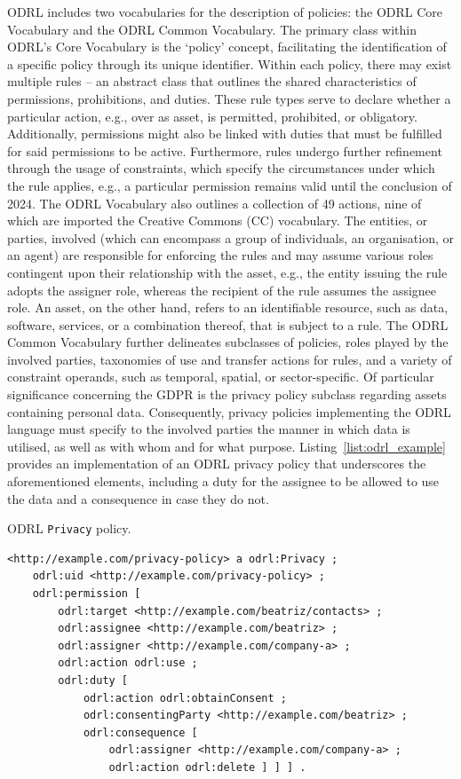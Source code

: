 ODRL includes two vocabularies for the description of policies: the ODRL Core Vocabulary and the ODRL Common Vocabulary.
The primary class within ODRL's Core Vocabulary is the `policy' concept, facilitating the identification of a specific policy through its unique identifier.
Within each policy, there may exist multiple rules -- an abstract class that outlines the shared characteristics of permissions, prohibitions, and duties.
These rule types serve to declare whether a particular action, e.g., over as asset, is permitted, prohibited, or obligatory.
Additionally, permissions might also be linked with duties that must be fulfilled for said permissions to be active.
Furthermore, rules undergo further refinement through the usage of constraints, which specify the circumstances under which the rule applies, e.g., a particular permission remains valid until the conclusion of 2024.
The ODRL Vocabulary also outlines a collection of 49 actions, nine of which are imported the Creative Commons (CC) vocabulary.
The entities, or parties, involved (which can encompass a group of individuals, an organisation, or an agent) are responsible for enforcing the rules and may assume various roles contingent upon their relationship with the asset, e.g., the entity issuing the rule adopts the assigner role, whereas the recipient of the rule assumes the assignee role.
An asset, on the other hand, refers to an identifiable resource, such as data, software, services, or a combination thereof, that is subject to a rule.
The ODRL Common Vocabulary further delineates subclasses of policies, roles played by the involved parties, taxonomies of use and transfer actions for rules, and a variety of constraint operands, such as temporal, spatial, or sector-specific.
Of particular significance concerning the GDPR is the privacy policy subclass regarding assets containing personal data. 
Consequently, privacy policies implementing the ODRL language must specify to the involved parties the manner in which data is utilised, as well as with whom and for what purpose.
Listing~\ref{list:odrl_example} provides an implementation of an ODRL privacy policy that underscores the aforementioned elements, including a duty for the assignee to be allowed to use the data and a consequence in case they do not.

\begin{listing}
\caption{ODRL \texttt{Privacy} policy.}
\label{list:odrl_example}
\begin{verbatim}
<http://example.com/privacy-policy> a odrl:Privacy ;
    odrl:uid <http://example.com/privacy-policy> ;
    odrl:permission [
        odrl:target <http://example.com/beatriz/contacts> ;
        odrl:assignee <http://example.com/beatriz> ;
        odrl:assigner <http://example.com/company-a> ;
        odrl:action odrl:use ;
        odrl:duty [
            odrl:action odrl:obtainConsent ;
            odrl:consentingParty <http://example.com/beatriz> ;
            odrl:consequence [
                odrl:assigner <http://example.com/company-a> ;
                odrl:action odrl:delete ] ] ] . 
\end{verbatim}
\end{listing}

